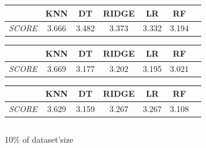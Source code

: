 \documentclass[12pt, titlepage]{article}
\begin{document}
\begin{figure}[ht]
    \flushleft
    \begin{subtable}{0.4\textwidth}
        \flushleft
        \footnotesize %
        \begin{tabular}{|l|c|c|c|c|c|c|}
            \hline
            & \textbf{KNN} & \textbf{DT} & \textbf{RIDGE} & \textbf{LR} & \textbf{RF} \\
            \hline
            \textit{SCORE} & 3.666 & 3.482 & 3.373 & 3.332 & 3.194 \\
            \hline
        \end{tabular}
        \caption{0.1\% of dataset'size}
        \label{tab:table1}
    \end{subtable}%
    \hspace{2.5cm} %
    \begin{subtable}{0.4\textwidth}
        \flushleft
        \footnotesize %
        \begin{tabular}{|l|c|c|c|c|c|c|}
        \hline
        & \textbf{KNN} & \textbf{DT} & \textbf{RIDGE} & \textbf{LR} & \textbf{RF} \\
        \hline
        \textit{SCORE} & 3.669 & 3.177 & 3.202 & 3.195 & 3.021 \\
        \hline
    \end{tabular}
        \caption{1\% of dataset'size}
        \label{tab:table2}
    \end{subtable}
    \hspace{2.5cm}
    \begin{subtable}{0.4\textwidth}
        \flushleft
        \footnotesize %
        \begin{tabular}{|l|c|c|c|c|c|c|}
        \hline
        & \textbf{KNN} & \textbf{DT} & \textbf{RIDGE} & \textbf{LR} & \textbf{RF} \\
        \hline
        \textit{SCORE} & 3.629 & 3.159 & 3.267 & 3.267 & 3.108 \\
        \hline
    \end{tabular}
        \caption{10\% of dataset'size}
        \label{tab:table2}
    \end{subtable}
    \hspace{2.5cm}
    \begin{subtable}{0.4\textwidth}
        \flushleft
        \footnotesize %
        \begin{tabular}{|l|c|c|c|c|c|c|}
        \hline

\end{tabular}
\end{subtable}
\end{figure}
\end{document}
